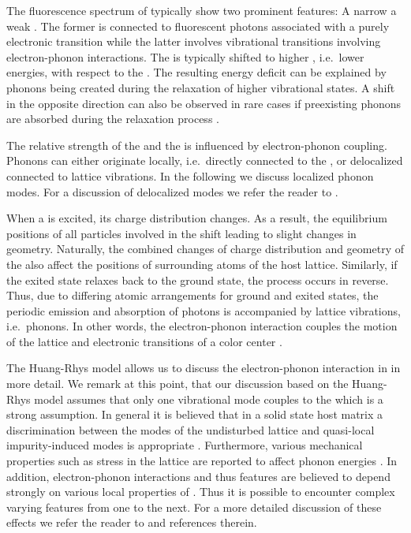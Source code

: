     The fluorescence spectrum of \sivs typically show two prominent features: A narrow \zpl a weak \psb. The former is connected to fluorescent photons associated with a purely electronic transition while the latter involves vibrational transitions involving electron-phonon interactions. The \psb is typically shifted to higher \wl, i.e.\ lower energies, with respect to the \zpl. The resulting energy deficit can be explained by phonons being created during the relaxation of higher vibrational states. A shift in the opposite direction can also be observed in rare cases if preexisting phonons are absorbed during the relaxation process \cite{Iakoubovskii2000thesis}.

    The relative strength of the \zpl and the \psb is influenced by electron-phonon coupling. Phonons can either originate locally, i.e.\ directly connected to the \siv, or delocalized connected to lattice vibrations. In the following we discuss localized phonon modes. For a discussion of delocalized modes we refer the reader to \cite{Feng1993b}. 

    When a \cc is excited, its charge distribution changes. As a result, the equilibrium positions of all particles involved in the \cc shift leading to slight changes in \cc geometry. Naturally, the combined changes of charge distribution and geometry of the \cc also affect the positions of surrounding atoms of the host lattice. Similarly, if the exited state relaxes back to the ground state, the process occurs in reverse. Thus, due to differing atomic arrangements for ground and exited states, the periodic emission and absorption of photons is accompanied by lattice vibrations, i.e.\ phonons. In other words, the electron-phonon interaction couples the motion of the lattice and electronic transitions of a color center \cite{Davies1981, Zaitsev2000}.

    The Huang-Rhys model allows us to discuss the electron-phonon interaction in \sivs in more detail.
    We remark at this point, that our discussion based on the Huang-Rhys model assumes that only one vibrational mode couples to the \cc which is a strong assumption. In general it is believed that in a solid state host matrix a discrimination between the modes of the undisturbed lattice and quasi-local impurity-induced modes is appropriate \cite{Zaitsev2000, Feng1993b, Solin1970}. Furthermore, various mechanical properties such as stress in the lattice are reported to affect phonon energies \cite{Grimsditch1978}. In addition, electron-phonon interactions and thus \psb features are believed to depend strongly on various local properties of \ccs \cite{Sternschulte1994, Huttner1995}. Thus it is possible to encounter complex varying \psb features from one \siv to the next. For a more detailed discussion of these effects we refer the reader to \cite{Neu2012, Riedrich-moller2014} and references therein.

